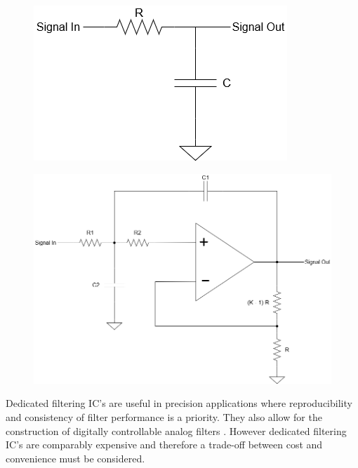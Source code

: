\begin{figure}[H]
	\centering
	\begin{minipage}{.42\textwidth}
		\centering
		\includegraphics[width=.9\linewidth]{figures/litreview/filter_basic.png}
		\label{fig:filter_basic_lpf}
	\end{minipage}%
	\hfill
	\begin{minipage}{.54\textwidth}
		\centering
		\includegraphics[width=.9\linewidth]{figures/litreview/vcvs_filter.png}
		\label{fig:vcvs_filter_lpf}
	\end{minipage}
\end{figure}

Dedicated filtering IC's are useful in precision applications where reproducibility and consistency of filter performance is a priority. They also allow for the construction of digitally controllable analog filters \cite{Huijing2010}. However dedicated filtering IC's are comparably expensive and therefore a trade-off between cost and convenience must be considered.

